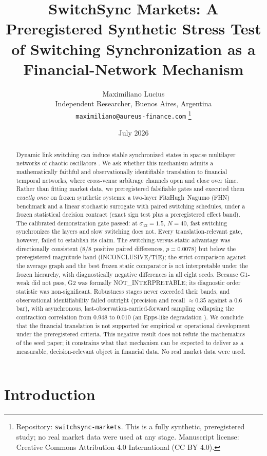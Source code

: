 \documentclass[11pt]{article}
\title{SwitchSync Markets: A Preregistered Synthetic Stress Test of Switching
Synchronization as a Financial-Network Mechanism}
\author{
  Maximiliano Lucius\\
  \small Independent Researcher, Buenos Aires, Argentina\\
  \small \texttt{maximiliano@aureus-finance.com}
  \thanks{Repository: \texttt{switchsync-markets}. This is a fully synthetic,
  preregistered study; no real market data were used at any stage. Manuscript
  license: Creative Commons Attribution 4.0 International (CC BY 4.0).}
}
\date{July 2026}
\begin{document}
\maketitle

\begin{abstract}
Dynamic link switching can induce stable synchronized states in sparse
multilayer networks of chaotic oscillators \citep{eser2025switching}. We ask
whether this mechanism admits a mathematically faithful and observationally
identifiable translation to financial temporal networks, where cross-venue
arbitrage channels open and close over time. Rather than fitting market data,
we preregistered falsifiable gates and executed them \emph{exactly once} on
frozen synthetic systems: a two-layer FitzHugh--Nagumo (FHN) benchmark and a
linear stochastic surrogate with paired switching schedules, under a frozen
statistical decision contract (exact sign test plus a preregistered effect
band). The calibrated demonstration gate passed: at $\sigma_{12}=1.5$, $N=40$,
fast switching synchronizes the layers and slow switching does not. Every
translation-relevant gate, however, failed to establish its claim. The
switching-versus-static advantage was directionally consistent (8/8 positive
paired differences, $p=0.0078$) but below the preregistered magnitude band
(INCONCLUSIVE/TIE); the strict comparison against the average graph and the
best frozen static comparator is not interpretable under the frozen hierarchy,
with diagnostically negative differences in all eight seeds. Because G1-weak
did not pass, G2 was formally NOT\_INTERPRETABLE; its diagnostic order
statistic was non-significant. Robustness stages never exceeded their bands,
and observational identifiability failed outright (precision and recall
$\approx0.35$ against a 0.6 bar), with asynchronous, last-observation-carried-forward
sampling collapsing the contraction correlation from $0.948$ to $0.010$
(an Epps-like degradation \citep{epps1979comovements}). We conclude that the
financial translation is not supported for empirical or operational
development under the preregistered criteria. This negative result does not
refute the mathematics of the seed paper; it constrains what that mechanism
can be expected to deliver as a measurable, decision-relevant object in
financial data. No real market data were used.
\end{abstract}

\section{Introduction}
\label{sec:intro}
\end{document}

